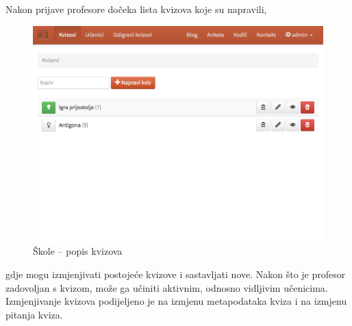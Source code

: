 \documentclass{scrreprt}
\begin{document}
Nakon prijave profesore dočeka lista kvizova koje su napravili,

\begin{figure}[H]
  \includegraphics[width=\textwidth, clip=true, trim=0 10cm 0 0, fbox]{school/quizzes}
  \caption{Škole -- popis kvizova}
\end{figure}

gdje mogu izmjenjivati postojeće kvizove i sastavljati nove. Nakon što je
profesor zadovoljan s kvizom, može ga učiniti aktivnim, odnosno vidljivim
učenicima. Izmjenjivanje kvizova podijeljeno je na izmjenu metapodataka kviza i
na izmjenu pitanja kviza.
\end{document}
